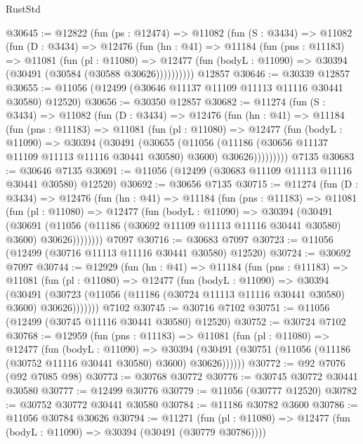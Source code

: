 \begin{lexlean}{RustStd}
\begin{coremodule}
@30645 := @12822
    (fun (ps : @12474) =>
    @11082
      (fun (S : @3434) =>
      @11082
        (fun (D : @3434) =>
        @12476
          (fun (hn : @41) =>
          @11184
            (fun (pns : @11183) =>
            @11081
              (fun (pl : @11080) =>
              @12477 (fun (bodyL : @11090) => @30394 (@30491 (@30584 (@30588 @30626))))))))))
    @12857
@30646 := @30339 @12857
@30655 := @11056 (@12499 (@30646 @11137 @11109 @11113 @11116 @30441 @30580) @12520)
@30656 := @30350 @12857
@30682 := @11274
    (fun (S : @3434) =>
    @11082
      (fun (D : @3434) =>
      @12476
        (fun (hn : @41) =>
        @11184
          (fun (pns : @11183) =>
          @11081
            (fun (pl : @11080) =>
            @12477
              (fun (bodyL : @11090) =>
              @30394
                (@30491
                  (@30655
                    (@11056
                      (@11186 (@30656 @11137 @11109 @11113 @11116 @30441 @30580) @3600)
                      @30626)))))))))
    @7135
@30683 := @30646 @7135
@30691 := @11056 (@12499 (@30683 @11109 @11113 @11116 @30441 @30580) @12520)
@30692 := @30656 @7135
@30715 := @11274
    (fun (D : @3434) =>
    @12476
      (fun (hn : @41) =>
      @11184
        (fun (pns : @11183) =>
        @11081
          (fun (pl : @11080) =>
          @12477
            (fun (bodyL : @11090) =>
            @30394
              (@30491
                (@30691
                  (@11056 (@11186 (@30692 @11109 @11113 @11116 @30441 @30580) @3600) @30626))))))))
    @7097
@30716 := @30683 @7097
@30723 := @11056 (@12499 (@30716 @11113 @11116 @30441 @30580) @12520)
@30724 := @30692 @7097
@30744 := @12929
    (fun (hn : @41) =>
    @11184
      (fun (pns : @11183) =>
      @11081
        (fun (pl : @11080) =>
        @12477
          (fun (bodyL : @11090) =>
          @30394
            (@30491
              (@30723 (@11056 (@11186 (@30724 @11113 @11116 @30441 @30580) @3600) @30626)))))))
    @7102
@30745 := @30716 @7102
@30751 := @11056 (@12499 (@30745 @11116 @30441 @30580) @12520)
@30752 := @30724 @7102
@30768 := @12959
    (fun (pns : @11183) =>
    @11081
      (fun (pl : @11080) =>
      @12477
        (fun (bodyL : @11090) =>
        @30394 (@30491 (@30751 (@11056 (@11186 (@30752 @11116 @30441 @30580) @3600) @30626))))))
@30772 := @92 @7076 (@92 @7085 @98)
@30773 := @30768 @30772
@30776 := @30745 @30772 @30441 @30580
@30777 := @12499 @30776
@30779 := @11056 (@30777 @12520)
@30782 := @30752 @30772 @30441 @30580
@30784 := @11186 @30782 @3600
@30786 := @11056 @30784 @30626
@30794 := @11271
    (fun (pl : @11080) => @12477 (fun (bodyL : @11090) => @30394 (@30491 (@30779 @30786))))

\end{coremodule}
\end{lexlean}
